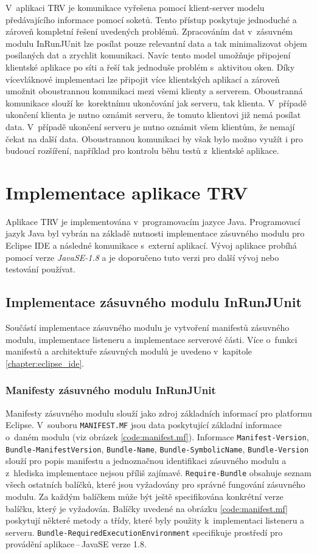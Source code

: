     \noindent
    V~aplikaci TRV je komunikace vyřešena pomocí klient-server modelu předávajícího informace pomocí soketů. Tento přístup poskytuje jednoduché a zároveň kompletní řešení uvedených problémů. Zpracováním dat v~zásuvném modulu InRunJUnit lze posílat pouze relevantní data a tak minimalizovat objem posílaných dat a zrychlit komunikaci. Navíc tento model umožňuje připojení klientské aplikace po síti a řeší tak jednoduše problém s~aktivitou oken. Díky vícevláknové implementaci lze připojit více klientských aplikací a zároveň umožnit oboustrannou komunikaci mezi všemi klienty a serverem. Oboustranná komunikace slouží ke~korektnímu ukončování jak serveru, tak klienta. V~případě ukončení klienta je nutno oznámit serveru, že tomuto klientovi již nemá posílat data. V~případě ukončení serveru je nutno oznámit všem klientům, že nemají čekat na další data. Oboustrannou komunikaci by však bylo možno využít i pro budoucí rozšíření, například pro kontrolu běhu testů z~klientské aplikace.

  \section{Implementace aplikace TRV}
  Aplikace TRV je implementována v~programovacím jazyce Java. Programovací jazyk Java byl vybrán na základě nutnosti implementace zásuvného modulu pro Eclipse IDE a následné komunikace s~externí aplikací. Vývoj aplikace probíhá pomocí verze \emph{JavaSE-1.8} a je doporučeno tuto verzi pro další vývoj nebo testování používat.

    \subsection{Implementace zásuvného modulu InRunJUnit}
    Součástí implementace zásuvného modulu je vytvoření manifestů zásuvného modulu, implementace listeneru a implementace serverové části. Více o~funkci manifestů a architektuře zásuvných modulů je uvedeno v~kapitole \ref{chapter:eclipse_ide}.

      \subsubsection{Manifesty zásuvného modulu InRunJUnit}
	Manifesty zásuvného modulu slouží jako zdroj základních informací pro platformu Eclipse. V~souboru \texttt{MANIFEST.MF} jsou data poskytující základní informace o~daném modulu (viz obrázek \ref{code:manifest.mf}). Informace \texttt{Manifest-Version}, \texttt{Bundle-ManifestVersion}, \texttt{Bundle-Name}, \texttt{Bundle-SymbolicName}, \texttt{Bundle-Version} slouží pro popis manifestu a jednoznačnou identifikaci zásuvného modulu a z~hlediska implementace nejsou příliš zajímavé. \texttt{Require-Bundle} obsahuje seznam všech ostatních balíčků, které jsou vyžadovány pro správné fungování zásuvného modulu. Za každým balíčkem může být ještě specifikována konkrétní verze balíčku, který je vyžadován. Balíčky uvedené na obrázku \ref{code:manifest.mf} poskytují některé metody a třídy, které byly použity k~implementaci listeneru a serveru. \texttt{Bundle-RequiredExecutionEnvironment} specifikuje prostředí pro provádění aplikace\,--\,JavaSE verze 1.8.
	
